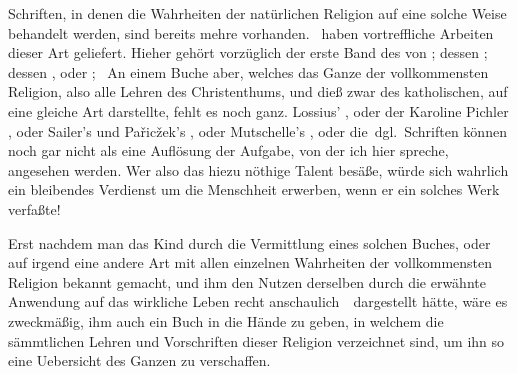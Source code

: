 \begin{aufza}
\begin{RWanm}
Schriften, in denen die Wahrheiten der natürlichen Religion auf eine solche Weise behandelt werden, sind bereits mehre vorhanden.  \uA\ haben vortreffliche Arbeiten dieser Art geliefert. Hieher gehört vorzüglich der erste Band des  von ; dessen ; dessen , oder ; \uam\  An einem Buche aber, welches das Ganze der vollkommensten Religion, also alle Lehren des Christenthums, und dieß zwar des katholischen, auf eine gleiche Art darstellte, fehlt es noch ganz. Lossius' , oder der Karoline Pichler , oder Sailer's und Pa\v{r}ic\v{z}ek's , oder Mutschelle's , oder die  \ua\,dgl.~Schriften können noch gar nicht als eine Auflösung der Aufgabe, von der ich hier spreche, angesehen werden. Wer also das hiezu nöthige Talent besäße, würde sich wahrlich ein bleibendes Verdienst um die Menschheit erwerben, wenn er ein solches Werk verfaßte!
\end{RWanm}
\item Erst nachdem man das Kind durch die Vermittlung eines solchen Buches, oder auf irgend eine andere Art mit allen einzelnen Wahrheiten der vollkommensten Religion bekannt gemacht, und ihm den Nutzen derselben durch die erwähnte Anwendung auf das wirkliche Leben recht anschaulich~\ dargestellt hätte, wäre es zweckmäßig, ihm auch ein Buch in die Hände zu geben, in welchem die sämmtlichen Lehren und Vorschriften dieser Religion  verzeichnet sind, um ihn so eine Uebersicht des Ganzen zu verschaffen.
\end{aufza}

